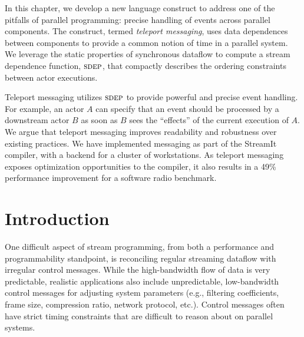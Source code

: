 \label{chap:messaging}

\newtheorem{definition}{Definition}
\newtheorem{theorem}{Theorem}

\newcommand{\floor}[2]{\left\lfloor\frac{#1}{#2}\right\rfloor}
\newcommand{\ceil}[2]{\left\lceil\frac{#1}{#2}\right\rceil}

\newcommand{\naive}[0]{na\"{\i}ve}
\newcommand{\Naive}[0]{Na\"{\i}ve}
\newcommand{\makeline}[0]{\rule{0cm}{0cm}\\\hrule\rule{0cm}{0cm}}

In this chapter, we develop a new language construct to address one of
the pitfalls of parallel programming: precise handling of events
across parallel components.  The construct, termed {\it teleport
  messaging}, uses data dependences between components to provide a
common notion of time in a parallel system.  We leverage the static
properties of synchronous dataflow to compute a stream dependence
function, $\textsc{sdep}$, that compactly describes the ordering constraints
between actor executions.

Teleport messaging utilizes $\textsc{sdep}$ to provide powerful and precise
event handling.  For example, an actor $A$ can specify that an event
should be processed by a downstream actor $B$ as soon as $B$ sees the
``effects'' of the current execution of $A$.  We argue that teleport
messaging improves readability and robustness over existing practices.
We have implemented messaging as part of the StreamIt compiler, with a
backend for a cluster of workstations.  As teleport messaging exposes
optimization opportunities to the compiler, it also results in a 49\%
performance improvement for a software radio benchmark.

\section{Introduction}

One difficult aspect of stream programming, from both a performance
and programmability standpoint, is reconciling regular streaming
dataflow with irregular control messages.  While the high-bandwidth
flow of data is very predictable, realistic applications also include
unpredictable, low-bandwidth control messages for adjusting system
parameters (e.g., filtering coefficients, frame size, compression
ratio, network protocol, etc.).  Control messages often have strict
timing constraints that are difficult to reason about on parallel
systems.

